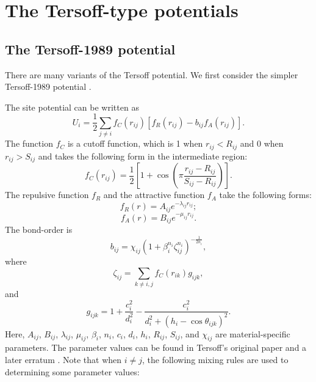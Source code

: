 \documentclass[12pt,a4paper]{report}
\begin{document}
\section{The Tersoff-type potentials}

\subsection{The Tersoff-1989 potential}

There are many variants of the Tersoff potential. We first consider the simpler Tersoff-1989 potential \cite{tersoff1989prb}.

The site potential can be written as
\begin{equation}
U_i =  \frac{1}{2} \sum_{j \neq i} f_C(r_{ij}) \left[ f_R(r_{ij}) - b_{ij} f_A(r_{ij}) \right].
\end{equation}
The function $f_{C}$ is a cutoff function, which is 1 when $r_{ij}<R_{ij}$ and 0 when  $r_{ij}>S_{ij}$ and takes the following form in the intermediate region:
\begin{equation}
f_{C}(r_{ij}) = \frac{1}{2}
\left[
1 + \cos \left( \pi \frac{r_{ij} - R_{ij}}{S_{ij} - R_{ij}} \right)
\right].
\end{equation}
The repulsive function $f_{R}$ and the attractive function $f_{A}$ take the following forms:
\begin{equation}
f_{R}(r) = A_{ij} e^{-\lambda_{ij} r_{ij}};
\end{equation}
\begin{equation}
f_{A}(r) = B_{ij} e^{-\mu_{ij} r_{ij}}.
\end{equation}
The bond-order is
\begin{equation}
\label{equation:bij}
b_{ij} = \chi_{ij} \left(1 + \beta_i^{n_i} \zeta^{n_i}_{ij}\right)^{-\frac{1}{2n_i}},
\end{equation}
where
\begin{equation}
\zeta_{ij} = \sum_{k\neq i, j}f_C(r_{ik}) g_{ijk},
\end{equation}
and
\begin{equation}
g_{ijk} = 1 + \frac{c_i^2}{d_i^2} - \frac{c_i^2}{d_i^2+(h_i-\cos\theta_{ijk})^2}.
\end{equation}
Here, $A_{ij}$, $B_{ij}$, $\lambda_{ij}$, $\mu_{ij}$, $\beta_i$, $n_i$, $c_i$, $d_i$, $h_i$, $R_{ij}$, $S_{ij}$, and $\chi_{ij}$ are material-specific parameters. The parameter values can be found in Tersoff's original paper \cite{tersoff1989prb} and a later erratum \cite{tersoff1990prb}. Note that when $i \neq j$, the following mixing rules are used to determining some parameter values:
\end{document}
